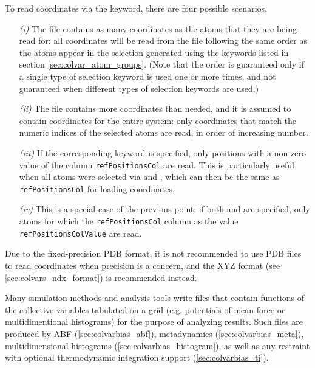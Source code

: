 {To read coordinates via the  keyword, there are four possible scenarios.
\begin{enumerate}
\item[\emph{(i)}] The file contains as many coordinates as the atoms that they are being read for: all coordinates will be read from the file following the same order as the atoms appear in the selection generated using the keywords listed in section \ref{sec:colvar_atom_groups}.
  (Note that the order is guaranteed only if a single type of selection keyword is used one or more times, and not guaranteed when different types of selection keywords are used.)
\item[\emph{(ii)}] The file contains more coordinates than needed, and it is assumed to contain coordinates for the entire system: only coordinates that match the numeric indices of the selected atoms are read, in order of increasing number.
\item[\emph{(iii)}] If the corresponding  keyword is specified, only positions with a non-zero value of the column \texttt{refPositionsCol} are read.
  This is particularly useful when all atoms were selected via  and , which can then be the same as \texttt{refPositionsCol} for loading coordinates.
\item[\emph{(iv)}] This is a special case of the previous point: if both  and  are specified, only atoms for which the \texttt{refPositionsCol} column as the value \texttt{refPositionsColValue} are read.
\end{enumerate}

Due to the fixed-precision PDB format, it is not recommended to use PDB files to read coordinates when precision is a concern, and the XYZ format (see \ref{sec:colvars_ndx_format}) is recommended instead.

} %



Many simulation methods and analysis tools write files that contain functions of the collective variables tabulated on a grid (e.g.{} potentials of mean force or multidimentional histograms) for the purpose of analyzing results.
Such files are produced by ABF (\ref{sec:colvarbias_abf}), metadynamics (\ref{sec:colvarbias_meta}), multidimensional histograms (\ref{sec:colvarbias_histogram}), as well as any restraint with optional thermodynamic integration support (\ref{sec:colvarbias_ti}).

